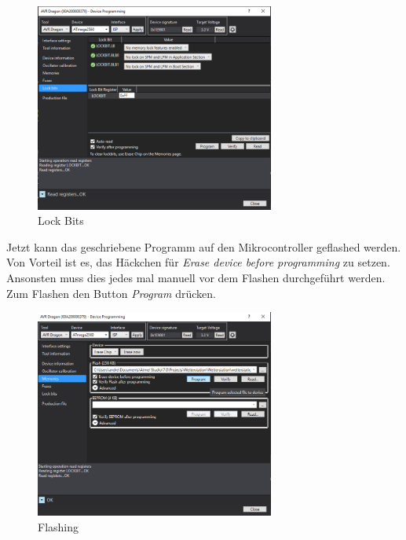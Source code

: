 \begin{figure}[h]
\centering
\includegraphics[width=0.7\textwidth]{../../../graphics/device_programming/4.PNG}
\caption{Lock Bits}
\label{fig:lockbits}
\end{figure}
Jetzt kann das geschriebene Programm auf den Mikrocontroller geflashed werden. Von Vorteil ist es, das Häckchen für \textit{Erase device before programming} zu setzen. Ansonsten muss dies jedes mal manuell vor dem Flashen durchgeführt werden. Zum Flashen den Button \textit{Program} drücken.\\

\begin{figure}[h]
\centering
\includegraphics[width=0.7\textwidth]{../../../graphics/device_programming/5.PNG}
\caption{Flashing}
\label{fig:flashing}
\end{figure}
